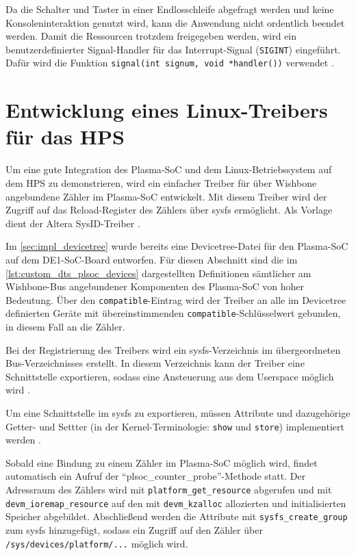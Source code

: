  Da die Schalter und Taster in einer Endlosschleife abgefragt werden und keine Konsoleninteraktion genutzt wird, kann die Anwendung nicht ordentlich beendet werden. Damit die Ressourcen trotzdem freigegeben werden, wird ein benutzerdefinierter Signal-Handler für das Interrupt-Signal (\texttt{SIGINT}) eingeführt. Dafür wird die Funktion \texttt{signal(int signum, void *handler())} verwendet \cite[88f]{book:c_and_linux}. 


\section{Entwicklung eines Linux-Treibers für das HPS}
\label{sec:impl_develop_linux_drivers_for_de1_soc}

Um eine gute Integration des Plasma-\gls{SoC} und dem Linux-Betriebssystem auf dem \gls{HPS} zu demonstrieren, wird ein einfacher Treiber für über Wishbone angebundene Zähler im Plasma-\gls{SoC} entwickelt. Mit diesem Treiber wird der Zugriff auf das Reload-Register des Zählers über sysfs ermöglicht. Als Vorlage dient der Altera SysID-Treiber \cite[Version~4.9.78-ltsi, \texttt{drivers/misc/altera\_sysid.c}]{website:linux_socfpga_repository}.

Im \cref{sec:impl_devicetree} wurde bereits eine Devicetree-Datei für den Plasma-\gls{SoC} auf dem DE1-SoC-Board entworfen. Für diesen Abschnitt sind die im \cref{lst:custom_dts_plsoc_devices} dargestellten Definitionen sämtlicher am Wishbone-Bus angebundener Komponenten des Plasma-\gls{SoC} von hoher Bedeutung. Über den \texttt{compatible}-Eintrag wird der Treiber an alle im Devicetree definierten Geräte mit übereinstimmenden \texttt{compatible}-Schlüsselwert gebunden, in diesem Fall an die Zähler.

Bei der Registrierung des Treibers wird ein sysfs-Verzeichnis im übergeordneten Bus-Verzeichnisses erstellt. In diesem Verzeichnis kann der Treiber eine Schnittstelle exportieren, sodass eine Ansteuerung aus dem Userspace möglich wird \cite[Version~4.9.78-ltsi, \texttt{Documentation/driver-model/driver.txt, Zeile~131}]{website:linux_socfpga_repository}.

Um eine Schnittstelle im sysfs zu exportieren, müssen Attribute und dazugehörige Getter- und Settter (in der Kernel-Terminologie: \texttt{show} und \texttt{store}) implementiert werden \cite[Version~4.9.78-ltsi, \texttt{Documentation/filesystems/sysfs.txt}, Zeile~233]{website:linux_socfpga_repository}. 

Sobald eine Bindung zu einem Zähler im Plasma-\gls{SoC} möglich wird, findet automatisch ein Aufruf der \enquote{plsoc\_counter\_probe}-Methode statt. Der Adressraum des Zählers wird mit \texttt{platform\_get\_resource} abgerufen und mit \texttt{devm\_ioremap\_resource} auf den mit \texttt{devm\_kzalloc} allozierten und initialisierten Speicher abgebildet. Abschließend werden die Attribute mit \texttt{sysfs\_create\_group} zum sysfs hinzugefügt, sodass ein Zugriff auf den Zähler über \texttt{/sys/devices/platform/...} möglich wird. 

